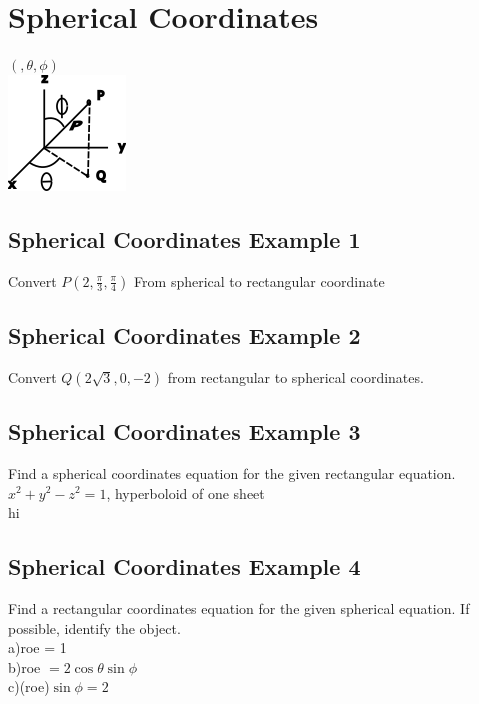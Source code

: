 \documentclass[12pt]{article}
\begin{document}
\section{Spherical Coordinates}	
$(,\theta,\phi)$\\%
\includegraphics{sphericalcoordinate}
\subsection{Spherical Coordinates Example 1}
Convert $P(2,\frac{\pi}{3},\frac{\pi}{4})$ From spherical to rectangular coordinate

\subsection{Spherical Coordinates Example 2}
Convert $Q(2\sqrt{3},0,-2)$ from rectangular to spherical coordinates.

\subsection{Spherical Coordinates Example 3}
Find a spherical coordinates equation for the given rectangular equation.\\%
$x^2+y^2-z^2=1$, hyperboloid of one sheet\\%
hi
\subsection{Spherical Coordinates Example 4}
Find a rectangular coordinates equation for the given spherical equation. If possible, identify the object.\\%
a)roe = 1\\%
b)roe $= 2\cos\theta\sin\phi$\\%
c)(roe)$\sin\phi=2$
\end{document}
